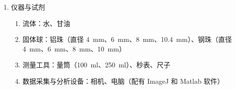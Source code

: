 \documentclass[a4paper]{article}
\begin{document}
\begin{enumerate}[label=\chinese*.,left=0pt]
\begin{enumerate}[label=\arabic*.,left = 0pt]
        \item 一个落在充满液体的圆筒的中心的物体下落速度可以通过以下公式修正：
        \begin{equation}
        \label{tab:corr}
            v_{\text{corr}} = \frac{v_{\text{meas}}}{1-2.10(d/D)+2.09(d/D)^3}
        \end{equation}
        其中，$v_{\text{meas}}$ 是实验测得的终速，$d$ 是球体的直径，$D$ 是量筒直径，$v_{\text{corr}}$ 是球体落在无界流体中终速的预期值。

        \item 高雷诺数下，物体运动受到的阻力符合公式：
        \begin{equation}
            \label{tab:drag}
            F_d=\frac{1}{2} \rho C_d A v^2
        \end{equation}
        其中 $C_d$ 是阻力系数，$A$ 是物体的横截面积。物体达到终速 $v_{\text{term}}$ 时，
        \begin{equation}
            \label{vterm2}
            v_{\text{term}}=\sqrt{\frac{2M'g}{\rho C_d A}} = \sqrt{\frac{2\cdot \frac{1}{6}d^3(\rho_{\text{铁}}-\rho_{\text{水}})g}{\rho_{\text{水}}C_d\frac{1}{4}\pi d^2}}=\sqrt{\frac{4(\rho_{\text{铁}}-\rho_{\text{水}})g}{3\pi\rho_{\text{水}}C_d}}d^{\frac{1}{2}}
        \end{equation}
    \end{enumerate}
    
    \item 仪器与试剂
    \begin{enumerate}[label=\textbullet,left = 0pt]
        \item 流体：水、甘油
        \item 固体球：铝珠（直径 \qty{4}{\milli \m}、\qty{6}{\milli \m}、\qty{8}{\milli \m}、\qty{10.4}{\milli \m}）、钢珠（直径 \qty{4}{\milli \m}、\qty{6}{\milli \m}、\qty{8}{\milli \m}、\qty{10}{\milli \m}）
        \item 测量工具：量筒（\qty{100}{\milli \litre}、\qty{250}{\milli \litre}）、秒表、尺子
        \item 数据采集与分析设备：相机、电脑（配有 ImageJ 和 Matlab 软件）
    \end{enumerate}
    

\end{enumerate}
\end{document}
